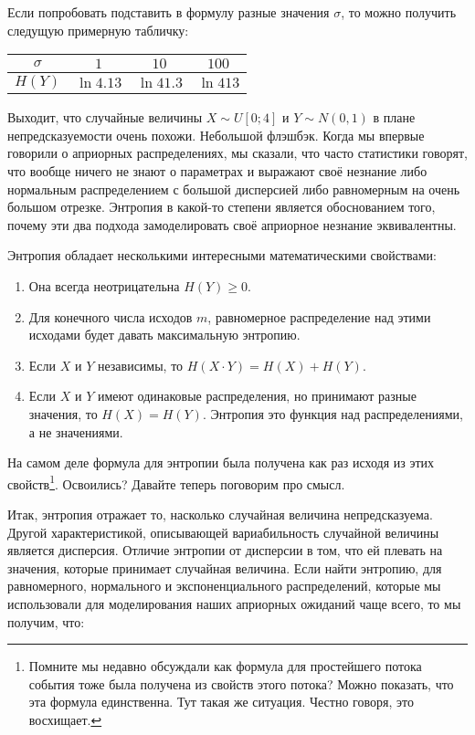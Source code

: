 \documentclass[12pt, a4paper, oneside]{extreport}
\theoremstyle{plain}              %
\theoremstyle{definition}         %
\begin{document}
Если попробовать подставить в формулу разные значения $\sigma$, то можно получить следущую примерную табличку: 

\begin{center}
	\begin{tabular}{c|c|c|c}
		$\sigma$ & $1$ & $10$  &  $100$  \\ \hline
		$H(Y)$ & $\ln 4.13 $ & $\ln 41.3 $  & $\ln 413 $
	\end{tabular}
\end{center}

Выходит, что случайные величины $X \sim U[0;4]$ и $Y \sim N(0,1)$ в плане непредсказуемости очень похожи. Небольшой флэшбэк. Когда мы впервые говорили о априорных распределениях, мы сказали, что часто статистики говорят, что вообще ничего не знают о параметрах и выражают своё незнание либо нормальным распределением с большой дисперсией либо равномерным на очень большом отрезке. Энтропия в какой-то степени является обоснованием того, почему эти два подхода замоделировать своё априорное незнание эквивалентны. 

Энтропия обладает несколькими интересными математическими свойствами:

\begin{enumerate}
	\item  Она всегда неотрицательна $H(Y) \ge 0$.
	
	\item  Для конечного числа исходов $m$, равномерное распределение над этими исходами будет давать максимальную энтропию. 
		
	\item Если $X$ и $Y$ независимы, то $H(X \cdot Y) = H(X) + H(Y)$. 
	
	\item Если $X$ и $Y$ имеют одинаковые распределения, но принимают разные значения, то $H(X) = H(Y)$. Энтропия это функция над распределениями, а не значениями. 
\end{enumerate}

На самом деле формула для энтропии была получена как раз исходя из этих свойств\footnote{Помните мы недавно обсуждали как формула для простейшего потока события тоже была получена из свойств этого потока? Можно показать, что эта формула единственна. Тут такая же ситуация. Честно говоря, это восхищает.}.  Освоились? Давайте теперь поговорим про смысл. 

Итак, энтропия отражает то, насколько случайная величина непредсказуема. Другой характеристикой, описывающей вариабильность случайной величины является дисперсия. Отличие энтропии от дисперсии в том, что ей плевать на значения, которые принимает случайная величина. Если найти энтропию, для равномерного, нормального и экспоненциального распределений, которые мы использовали для моделирования наших априорных ожиданий чаще всего, то мы получим, что:
\end{document}
